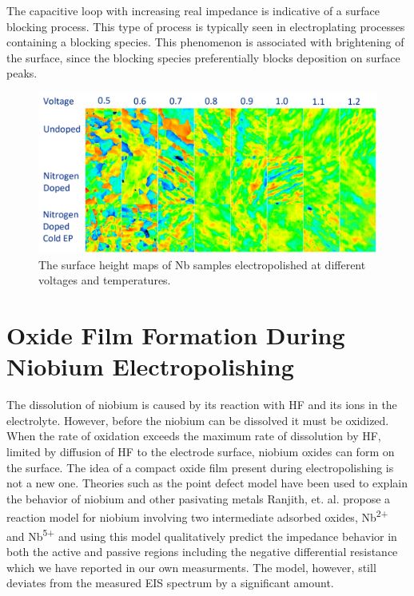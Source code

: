 \documentclass{revtex4-2}
\begin{document}
The capacitive loop with increasing real impedance is indicative of a surface blocking process. This type of process is typically seen in electroplating processes containing a blocking species. This phenomenon is associated with brightening of the surface, since the blocking species preferentially blocks deposition on surface peaks.


\begin{figure}[t]
    \label{fig:surface_maps}
    \includegraphics[width=\textwidth]{../figures/surface_maps.png}
    \caption{The surface height maps of Nb samples electropolished at different voltages and temperatures.}
\end{figure}

\section{Oxide Film Formation During Niobium Electropolishing}

The dissolution of niobium is caused by its reaction with HF and its ions in the electrolyte. However, before the niobium can be dissolved it must be oxidized. When the rate of oxidation exceeds the maximum rate of dissolution by HF, limited by diffusion of HF to the electrode surface, niobium oxides can form on the surface. The idea of a compact oxide film present during electropolishing is not a new one.\cite{Tian_2008,tian2008novel} Theories such as the point defect model have been used to explain the behavior of niobium and other pasivating metals\cite{bojinov1997ability, girginov2008conduction, bojinov2003evidence, macdonald1990theory, macdonald1992steady} Ranjith, et. al. propose a reaction model for niobium involving two intermediate adsorbed oxides, Nb\textsuperscript{2+} and Nb\textsuperscript{5+} and using this model qualitatively predict the impedance behavior in both the active and passive regions including the negative differential resistance which we have reported in our own measurments. The model, however, still deviates from the measured EIS spectrum by a significant amount.\cite{ranjith2018anodic}
\end{document}
